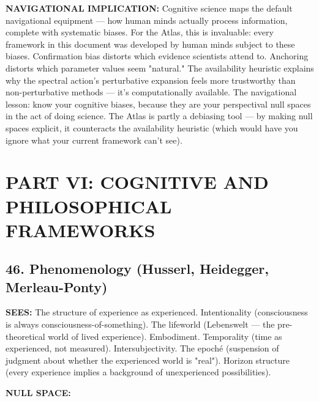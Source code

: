 \textbf{NAVIGATIONAL IMPLICATION:} Cognitive science maps the default navigational equipment — how human minds actually process information, complete with systematic biases. For the Atlas, this is invaluable: every framework in this document was developed by human minds subject to these biases. Confirmation bias distorts which evidence scientists attend to. Anchoring distorts which parameter values seem "natural." The availability heuristic explains why the spectral action's perturbative expansion feels more trustworthy than non-perturbative methods — it's computationally available. The navigational lesson: know your cognitive biases, because they are your perspectival null spaces in the act of doing science. The Atlas is partly a debiasing tool — by making null spaces explicit, it counteracts the availability heuristic (which would have you ignore what your current framework can't see).


\bigskip\noindent\makebox[\textwidth]{\color{rulegray}\rule{5cm}{0.3pt}}\bigskip


\section*{PART VI: COGNITIVE AND PHILOSOPHICAL FRAMEWORKS}


\subsection*{46. Phenomenology (Husserl, Heidegger, Merleau-Ponty)}


\textbf{SEES:} The structure of experience as experienced. Intentionality (consciousness is always consciousness-of-something). The lifeworld (Lebenswelt — the pre-theoretical world of lived experience). Embodiment. Temporality (time as experienced, not measured). Intersubjectivity. The epoché (suspension of judgment about whether the experienced world is "real"). Horizon structure (every experience implies a background of unexperienced possibilities).


\textbf{NULL SPACE:}

